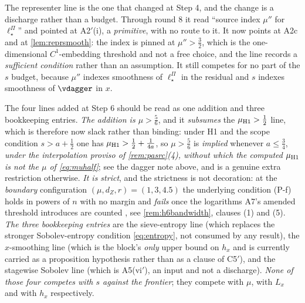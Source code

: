 The representer line is the one that changed at Step 4, and the change is a discharge rather than a
budget. Through round 8 it read ``source index $\mu''$ for $\ell^\Pi_\star$'' and pointed at
A2$'$(i), a \emph{primitive}, with no route to it. It now points at A2c and at
\cref{lem:reprsmooth}: the index is pinned at $\mu''>\tfrac32$, which is the one-dimensional
$C^{1}$-embedding threshold and not a free choice, and the line records a \emph{sufficient condition}
rather than an assumption. It still competes for no part of the $s$ budget, because $\mu''$ indexes
smoothness of $\ell^\Pi_\star$ in the residual and $s$ indexes smoothness of $\vdagger$ in $x$.

The four lines added at Step 6 should be read as one addition and three bookkeeping entries.
\emph{The addition is $\mu>\tfrac56$}, and it \emph{subsumes} the $\mu_{\text{\textup{H1}}}>\tfrac12$ line,
which is therefore now slack rather than binding: under H1 and the scope condition $s>a+\tfrac12$ one has
$\mu_{\text{\textup{H1}}}>\tfrac12+\tfrac1{4a}$, so $\mu>\tfrac56$ is \emph{implied} whenever
$a\le\tfrac34$, \emph{under the interpolation proviso of \cref{rem:pasrc}\textup{(4)}, without which the
computed $\mu_{\text{\textup{H1}}}$ is not the $\mu$ of \eqref{eq:muhalf}}; see the dagger note above, and is a
genuine extra restriction otherwise. \emph{It is strict}, and the strictness is not decoration: at the
\emph{boundary} configuration $(\mu,d_Z,r)=(1,3,4.5)$ the underlying condition (P-f) holds in powers of
$n$ with no margin and \emph{fails} once the logarithms A7's amended threshold introduces are counted
, see \cref{rem:h6bandwidth}, clauses (1) and (5). \emph{The three bookkeeping entries} are the
sieve-entropy line (which replaces the stronger Sobolev-entropy condition \eqref{eq:entropy}, not
consumed by any result), the $x$-smoothing line (which is the block's \emph{only} upper bound on $h_x$
and is currently carried as a proposition hypothesis rather than as a clause of C5$'$), and the
stagewise Sobolev line (which is A5(vi$'$), an input and not a discharge). \emph{None of those four
competes with $s$ against the frontier}; they compete with $\mu$, with $L_x$ and with $h_x$
respectively.


